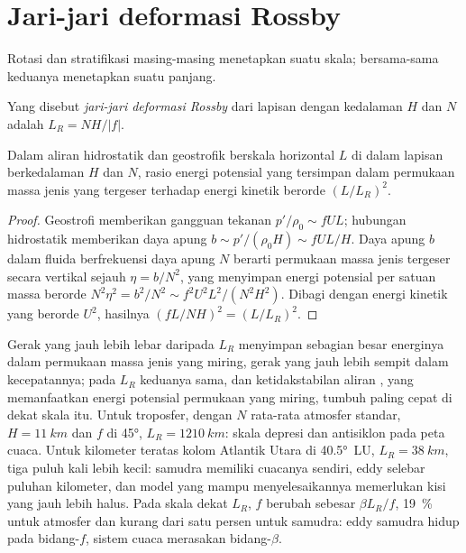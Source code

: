 \section{Jari-jari deformasi Rossby}\label{sec:b3:gfd-foundations:rossby-radius}

Rotasi dan stratifikasi masing-masing menetapkan suatu skala; bersama-sama keduanya menetapkan
suatu panjang.

\begin{definition}\label{def:b3:gfd-foundations:rossby-radius}
Yang disebut \emph{jari-jari deformasi Rossby}
dari lapisan dengan kedalaman $H$ dan  $N$ adalah $L_R = NH/|f|$.
\end{definition}

\begin{proposition}\label{prop:b3:gfd-foundations:rossby-radius}
Dalam aliran hidrostatik dan geostrofik berskala horizontal $L$ di dalam lapisan
berkedalaman $H$ dan  $N$, rasio energi potensial
yang tersimpan dalam permukaan massa jenis yang tergeser terhadap energi kinetik berorde
$(L/L_R)^2$.
\end{proposition}

\begin{proof}
Geostrofi memberikan gangguan tekanan $p'/\rho_0 \sim fUL$; hubungan
hidrostatik memberikan daya apung $b \sim p'/(\rho_0H) \sim fUL/H$. Daya apung
$b$ dalam fluida berfrekuensi daya apung $N$ berarti permukaan massa jenis
tergeser secara vertikal sejauh $\eta = b/N^2$, yang menyimpan energi potensial per
satuan massa berorde $N^2\eta^2 = b^2/N^2 \sim f^2U^2L^2/(N^2H^2)$. Dibagi
dengan energi kinetik yang berorde $U^2$, hasilnya $(fL/NH)^2 = (L/L_R)^2$.
\end{proof}

Gerak yang jauh lebih lebar daripada $L_R$ menyimpan sebagian besar energinya dalam
permukaan massa jenis yang miring, gerak yang jauh lebih sempit dalam kecepatannya; pada $L_R$ keduanya
sama, dan ketidakstabilan aliran , yang memanfaatkan
energi potensial permukaan yang miring, tumbuh paling cepat di dekat skala itu. Untuk
troposfer, dengan $N$ rata-rata atmosfer standar, $H =
\qty{11}{km}$ dan $f$ di \ang{45}, $L_R = \qty{1210}{km}$: skala
depresi dan antisiklon pada peta cuaca. Untuk kilometer teratas
kolom Atlantik Utara di \ang{40.5}~LU, $L_R = \qty{38}{km}$, tiga puluh
kali lebih kecil: samudra memiliki cuacanya sendiri, eddy selebar puluhan
kilometer, dan model yang mampu menyelesaikannya memerlukan kisi yang jauh lebih halus. Pada skala
dekat $L_R$, $f$ berubah sebesar $\beta L_R/f$, \qty{19}{\percent} untuk
atmosfer dan kurang dari satu persen untuk samudra: eddy samudra hidup pada
bidang-$f$, sistem cuaca merasakan bidang-$\beta$.

